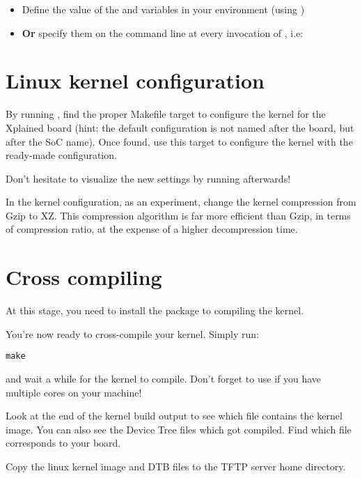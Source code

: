 \begin{itemize}
\item Define the value of the  and 
  variables in your environment (using )
\item {\bf Or} specify them on the command line at every invocation of
  , i.e: 
\end{itemize}

\section{Linux kernel configuration}

By running , find the proper Makefile target to
configure the kernel for the Xplained board (hint: the default
configuration is not named after the board, but after the SoC
name). Once found, use this target to configure the kernel with the
ready-made configuration.

Don't hesitate to visualize the new settings by running
 afterwards!

In the kernel configuration, as an experiment, change the kernel
compression from Gzip to XZ. This compression algorithm is far more
efficient than Gzip, in terms of compression ratio, at the expense of
a higher decompression time.

\section{Cross compiling}

At this stage, you need to install the 
package to compiling the kernel.

You're now ready to cross-compile your kernel. Simply run:

\begin{verbatim}
make
\end{verbatim}

and wait a while for the kernel to compile. Don't forget to use
 if you have multiple cores on your machine!

Look at the end of the kernel build output to see which file contains
the kernel image. You can also see the Device Tree  files
which got compiled. Find which  file corresponds to your
board.

Copy the linux kernel image and DTB files to the TFTP server 
home directory.

